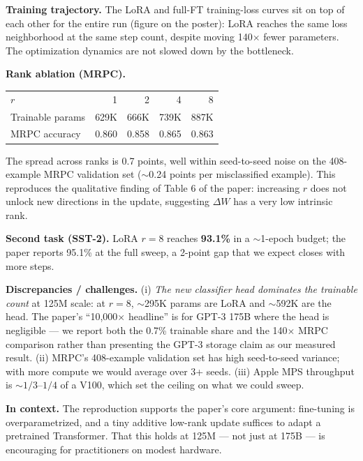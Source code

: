 \documentclass[11pt]{article}
\begin{document}
\textbf{Training trajectory.} The LoRA and full-FT training-loss curves
sit on top of each other for the entire run (figure on the poster):
LoRA reaches the same loss neighborhood at the same step count, despite
moving 140$\times$ fewer parameters. The optimization dynamics are not
slowed down by the bottleneck.

\textbf{Rank ablation (MRPC).}
\vspace{-2pt}
\begin{center}
\small
\begin{tabular}{lrrrr}
\toprule
$r$ & 1 & 2 & 4 & 8 \\
Trainable params & 629K & 666K & 739K & 887K \\
MRPC accuracy & 0.860 & 0.858 & 0.865 & 0.863 \\
\bottomrule
\end{tabular}
\end{center}
\vspace{-2pt}
The spread across ranks is 0.7 points, well within seed-to-seed noise on
the 408-example MRPC validation set ($\sim$0.24 points per misclassified
example). This reproduces the qualitative finding of Table 6 of the paper:
increasing $r$ does not unlock new directions in the update, suggesting
$\Delta W$ has a very low intrinsic rank.

\textbf{Second task (SST-2).} LoRA $r{=}8$ reaches \textbf{93.1\%} in a
$\sim$1-epoch budget; the paper reports 95.1\% at the full sweep, a 2-point
gap that we expect closes with more steps.

\textbf{Discrepancies / challenges.} (i) \emph{The new classifier head
dominates the trainable count} at 125M scale: at $r{=}8$, $\sim$295K params
are LoRA and $\sim$592K are the head. The paper's ``10{,}000$\times$
headline'' is for GPT-3 175B where the head is negligible --- we report both
the 0.7\% trainable share and the 140$\times$ MRPC comparison rather than
presenting the GPT-3 storage claim as our measured result. (ii) MRPC's
408-example validation set has high seed-to-seed variance; with more
compute we would average over 3+ seeds. (iii) Apple MPS throughput is
$\sim 1/3$--$1/4$ of a V100, which set the ceiling on what we could sweep.

\textbf{In context.} The reproduction supports the paper's core argument:
fine-tuning is overparametrized, and a tiny additive low-rank update
suffices to adapt a pretrained Transformer. That this holds at 125M ---
not just at 175B --- is encouraging for practitioners on modest hardware.
\end{document}
